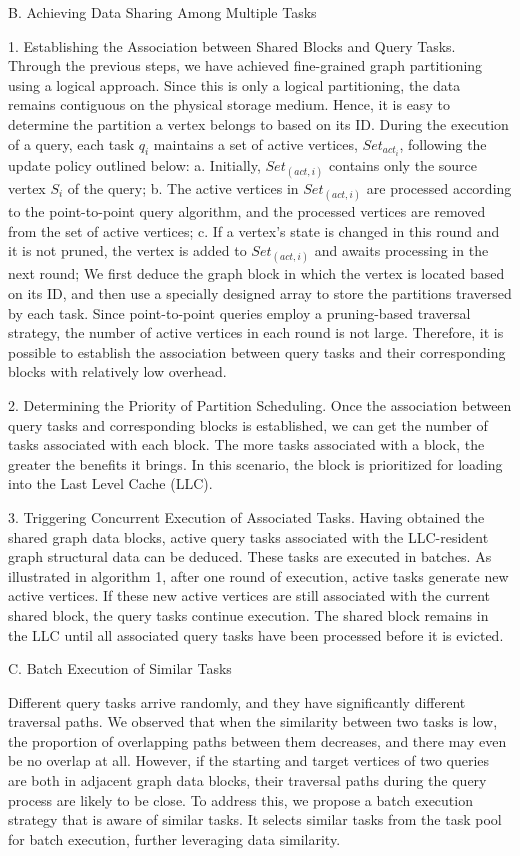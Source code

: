 \documentclass[lettersize,journal]{IEEEtran} %
\begin{document}
B. Achieving Data Sharing Among Multiple Tasks

1. Establishing the Association between Shared Blocks and Query Tasks. Through the previous steps, we have achieved fine-grained graph partitioning using a logical approach. Since this is only a logical partitioning, the data remains contiguous on the physical storage medium. Hence, it is easy to determine the partition a vertex belongs to based on its ID. During the execution of a query, each task $q_i$ maintains a set of active vertices, $Set_{act_i}$, following the update policy outlined below:
a. Initially, $Set_(act,i)$ contains only the source vertex $S_i$ of the query;
b. The active vertices in $Set_(act,i)$ are processed according to the point-to-point query algorithm, and the processed vertices are removed from the set of active vertices;
c. If a vertex's state is changed in this round and it is not pruned, the vertex is added to $Set_(act,i)$ and awaits processing in the next round;
We first deduce the graph block in which the vertex is located based on its ID, and then use a specially designed array to store the partitions traversed by each task. Since point-to-point queries employ a pruning-based traversal strategy, the number of active vertices in each round is not large. Therefore, it is possible to establish the association between query tasks and their corresponding blocks with relatively low overhead.

2. Determining the Priority of Partition Scheduling. Once the association between query tasks and corresponding blocks is established, we can get the number of tasks associated with each block. The more tasks associated with a block, the greater the benefits it brings. In this scenario, the block is prioritized for loading into the Last Level Cache (LLC).

3. Triggering Concurrent Execution of Associated Tasks. Having obtained the shared graph data blocks, active query tasks associated with the LLC-resident graph structural data can be deduced. These tasks are executed in batches. As illustrated in algorithm 1, after one round of execution, active tasks generate new active vertices. If these new active vertices are still associated with the current shared block, the query tasks continue execution. The shared block remains in the LLC until all associated query tasks have been processed before it is evicted.

C. Batch Execution of Similar Tasks

Different query tasks arrive randomly, and they have significantly different traversal paths. We observed that when the similarity between two tasks is low, the proportion of overlapping paths between them decreases, and there may even be no overlap at all. However, if the starting and target vertices of two queries are both in adjacent graph data blocks, their traversal paths during the query process are likely to be close. To address this, we propose a batch execution strategy that is aware of similar tasks. It selects similar tasks from the task pool for batch execution, further leveraging data similarity.
\end{document}

